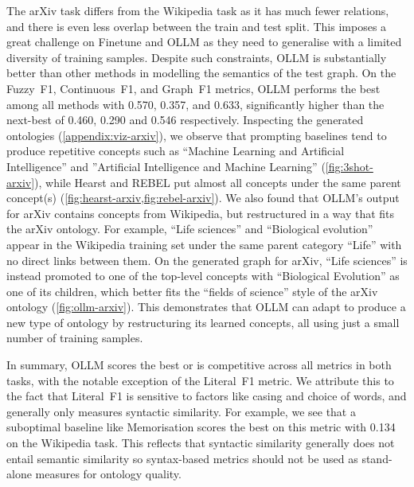 \documentclass{article}
\newcommand{\name}{{OLLM}\xspace}
\begin{document}
The arXiv task differs from the Wikipedia task as it has much fewer relations, and there is even less overlap between the train and test split. This imposes a great challenge on Finetune and \name as they need to generalise with a limited diversity of training samples. Despite such constraints, \name is substantially better than other methods in modelling the semantics of the test graph.
On the Fuzzy~F1, Continuous~F1, and Graph~F1 metrics, \name performs the best among all methods with 0.570, 0.357, and 0.633, significantly higher than the next-best of 0.460, 0.290 and 0.546 respectively.
Inspecting the generated ontologies (\cref{appendix:viz-arxiv}), we observe that prompting baselines tend to produce repetitive concepts such as ``Machine Learning and Artificial Intelligence'' and ''Artificial Intelligence and Machine Learning'' (\cref{fig:3shot-arxiv}), while Hearst and REBEL put almost all concepts under the same parent concept(s) (\cref{fig:hearst-arxiv,fig:rebel-arxiv}).
We also found that \name's output for arXiv contains concepts from Wikipedia, but restructured in a way that fits the arXiv ontology. For example, ``Life sciences'' and ``Biological evolution'' appear in the Wikipedia training set under the same parent category ``Life'' with no direct links between them. On the generated graph for arXiv, ``Life sciences'' is instead promoted to one of the top-level concepts with ``Biological Evolution'' as one of its children, which better fits the ``fields of science'' style of the arXiv ontology (\cref{fig:ollm-arxiv}). This demonstrates that \name can adapt to produce a new type of ontology by restructuring its learned concepts, all using just a small number of training samples.

In summary, \name scores the best or is competitive across all metrics in both tasks, with the notable exception of the Literal~F1 metric. We attribute this to the fact that Literal~F1 is sensitive to factors like casing and choice of words, and generally only measures syntactic similarity. For example, we see that a suboptimal baseline like Memorisation scores the best on this metric with 0.134 on the Wikipedia task. This reflects that syntactic similarity generally does not entail semantic similarity so syntax-based metrics should not be used as stand-alone measures for ontology quality.

\end{document}
